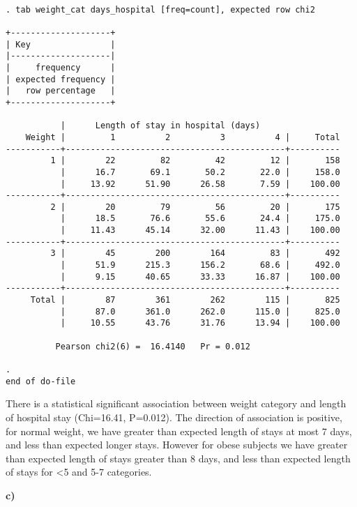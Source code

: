 \documentclass{article}
\begin{document}
\begin{verbatim}

. tab weight_cat days_hospital [freq=count], expected row chi2

+--------------------+
| Key                |
|--------------------|
|     frequency      |
| expected frequency |
|   row percentage   |
+--------------------+

           |      Length of stay in hospital (days)
    Weight |         1          2          3          4 |     Total
-----------+--------------------------------------------+----------
         1 |        22         82         42         12 |       158 
           |      16.7       69.1       50.2       22.0 |     158.0 
           |     13.92      51.90      26.58       7.59 |    100.00 
-----------+--------------------------------------------+----------
         2 |        20         79         56         20 |       175 
           |      18.5       76.6       55.6       24.4 |     175.0 
           |     11.43      45.14      32.00      11.43 |    100.00 
-----------+--------------------------------------------+----------
         3 |        45        200        164         83 |       492 
           |      51.9      215.3      156.2       68.6 |     492.0 
           |      9.15      40.65      33.33      16.87 |    100.00 
-----------+--------------------------------------------+----------
     Total |        87        361        262        115 |       825 
           |      87.0      361.0      262.0      115.0 |     825.0 
           |     10.55      43.76      31.76      13.94 |    100.00 

          Pearson chi2(6) =  16.4140   Pr = 0.012

. 
end of do-file

\end{verbatim}

There is a statistical significant association between weight category and length of hospital stay (Chi=16.41, P=0.012).  The direction of association is positive, for normal weight, we have greater than expected length of stays at most 7 days, and less than expected longer stays.  However for obese subjects we have greater than expected length of stays greater than 8 days, and less than expected length of stays for <5 and 5-7 categories.

\textbf{c)}
\end{document}

